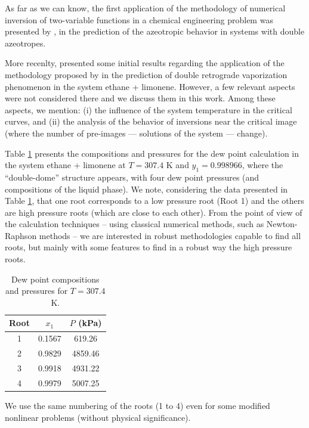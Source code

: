 \documentclass{article}
\theoremstyle{definition}
\theoremstyle{remark}
\begin{document}
As far as we can know, the first application of the methodology  of 
numerical inversion of two-variable functions in a chemical 
engineering problem was presented by \cite{canadian}, in the 
prediction of the azeotropic behavior in systems with double 
azeotropes.

More recenlty, \cite{ireme} presented some initial results regarding the application of the methodology proposed by \cite{malta} in the prediction of double retrograde vaporization phenomenon in the system ethane + limonene. However, a few relevant aspects were not considered there and we discuss them in this work. Among these aspects, we mention: (i) the influence of the system temperature in the critical curves, and (ii) the analysis of the behavior of inversions near the critical image (where the number of pre-images --- solutions of the 
system --- change).

Table \ref{tab:roots} presents the compositions and pressures for the dew point calculation in the system ethane + limonene at $T = 307.4$ K and $y_1 = 0.998966$, where the ``double-dome'' structure appears, with four dew point pressures (and compositions of the liquid phase). We note, considering the data presented in Table \ref{tab:roots}, that one root corresponds to a low pressure root (Root 1) and the others
are high pressure roots (which are close to each other).
 From the point of view of the calculation techniques -- using classical numerical methods, such as Newton-Raphson methods -- we are interested in robust methodologies capable to find all roots, but mainly with some features to find in a robust way the high pressure roots.

\begin{table}[http!]
	\begin{center}
	\caption{ {\small Dew point compositions and pressures for $T = 307.4$ K.}}\label{tab:roots}
	\begin{tabular}{ccc} \hline \small
Root & $x_1$ & $P$ (kPa) \\
\hline
1 & 0.1567 & 619.26 \\
2 & 0.9829 & 4859.46 \\
3 & 0.9918 & 4931.22 \\
4 & 0.9979 & 5007.25 \\
	\hline
	\end{tabular}
	
	\end{center}
\end{table}

We use the same numbering  of
 the roots (1 to 4) even for some modified nonlinear problems
  (without physical significance).
\end{document}
